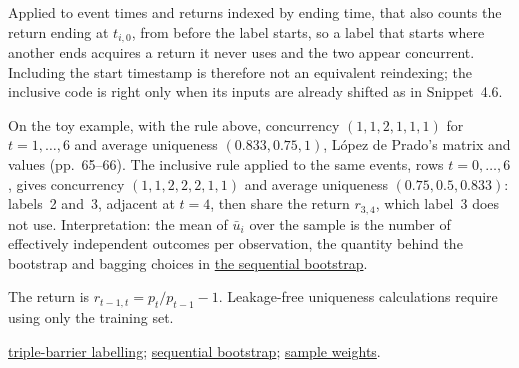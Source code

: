\begin{qfdefinition}
Applied to event times and returns indexed by ending time, that also counts the return ending at $t_{i,0}$, from before the label starts, so a label that starts where another ends acquires a return it never uses and the two appear concurrent. Including the start timestamp is therefore not an equivalent reindexing; the inclusive code is right only when its inputs are already shifted as in Snippet~4.6.

 On the toy example, with the rule above, concurrency $(1,1,2,1,1,1)$ for $t=1,\dots,6$ and average uniqueness $(0.833,0.75,1)$, López de Prado's matrix and values (pp.~65--66). The inclusive rule applied to the same events, rows $t=0,\dots,6$, gives concurrency $(1,1,2,2,2,1,1)$ and average uniqueness $(0.75,0.5,0.833)$: labels~2 and~3, adjacent at $t=4$, then share the return $r_{3,4}$, which label~3 does not use. Interpretation: the mean of $\bar u_i$ over the sample is the number of effectively independent outcomes per observation, the quantity behind the bootstrap and bagging choices in \hyperref[meth:sequential-bootstrap]{the sequential bootstrap}.

 The return is $r_{t-1,t}=p_t/p_{t-1}-1$. Leakage-free uniqueness calculations require using only the training set.

 \hyperref[meth:triple-barrier-labelling]{triple-barrier labelling}; \hyperref[meth:sequential-bootstrap]{sequential bootstrap}; \hyperref[meth:sample-weights-attribution-decay]{sample weights}.

\end{qfdefinition}


